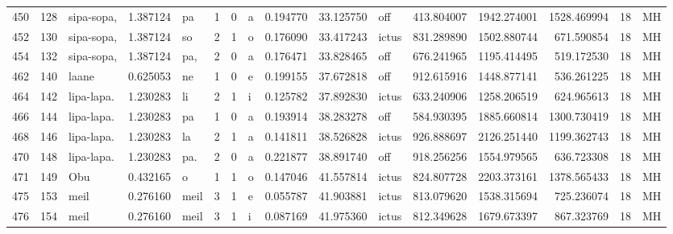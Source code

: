 \begin{tabular}{lrlrllllrrlrrrll}
450  &         128 &       sipa-sopa, &  1.387124 &      pa &        1 &      0 &       a &      0.194770 &     33.125750 &    off &   413.804007 &  1942.274001 &  1528.469994 &     18 &        MH \\
452  &         130 &       sipa-sopa, &  1.387124 &      so &        2 &      1 &       o &      0.176090 &     33.417243 &  ictus &   831.289890 &  1502.880744 &   671.590854 &     18 &        MH \\
454  &         132 &       sipa-sopa, &  1.387124 &     pa, &        2 &      0 &       a &      0.176471 &     33.828465 &    off &   676.241965 &  1195.414495 &   519.172530 &     18 &        MH \\
462  &         140 &            laane &  0.625053 &      ne &        1 &      0 &       e &      0.199155 &     37.672818 &    off &   912.615916 &  1448.877141 &   536.261225 &     18 &        MH \\
464  &         142 &       lipa-lapa. &  1.230283 &      li &        2 &      1 &       i &      0.125782 &     37.892830 &  ictus &   633.240906 &  1258.206519 &   624.965613 &     18 &        MH \\
466  &         144 &       lipa-lapa. &  1.230283 &      pa &        1 &      0 &       a &      0.193914 &     38.283278 &    off &   584.930395 &  1885.660814 &  1300.730419 &     18 &        MH \\
468  &         146 &       lipa-lapa. &  1.230283 &      la &        2 &      1 &       a &      0.141811 &     38.526828 &  ictus &   926.888697 &  2126.251440 &  1199.362743 &     18 &        MH \\
470  &         148 &       lipa-lapa. &  1.230283 &     pa. &        2 &      0 &       a &      0.221877 &     38.891740 &    off &   918.256256 &  1554.979565 &   636.723308 &     18 &        MH \\
471  &         149 &              Obu &  0.432165 &       o &        1 &      1 &       o &      0.147046 &     41.557814 &  ictus &   824.807728 &  2203.373161 &  1378.565433 &     18 &        MH \\
475  &         153 &             meil &  0.276160 &    meil &        3 &      1 &       e &      0.055787 &     41.903881 &  ictus &   813.079620 &  1538.315694 &   725.236074 &     18 &        MH \\
476  &         154 &             meil &  0.276160 &    meil &        3 &      1 &       i &      0.087169 &     41.975360 &  ictus &   812.349628 &  1679.673397 &   867.323769 &     18 &        MH \\

\end{tabular}
